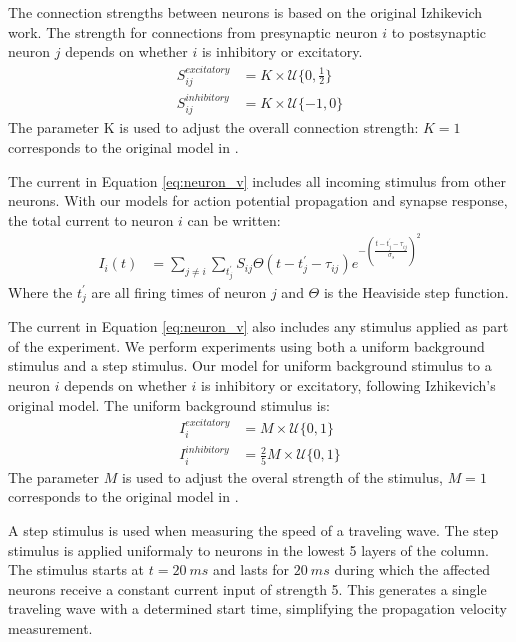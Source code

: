\documentclass[a4paper,11pt]{article}
\begin{document}
The connection strengths between neurons is based on the original Izhikevich work.
The strength for connections from presynaptic neuron $i$ to postsynaptic neuron $j$ depends on whether $i$ is inhibitory or excitatory.
\begin{align}
 S_{ij}^{excitatory} &= K \times \mathcal{U}\{0,\frac{1}{2} \} \\
 S_{ij}^{inhibitory} &= K \times \mathcal{U}\{-1,0 \} 
\end{align}
The parameter K is used to adjust the overall connection strength: $K=1$ corresponds to the original model in \cite{izzy_code}. 

The current in Equation \ref{eq:neuron_v} includes all incoming stimulus from other neurons.
With our models for action potential propagation and synapse response, the total current to neuron $i$ can be written:
\begin{align}
 I_i(t) &= \sum_{j\ne i} \sum_{t^\prime_j} S_{ij}  \Theta(t-t^\prime_j-\tau_{ij})e^{-(\frac{t-t^\prime_j-\tau_{ij}}{\sigma_s})^2}
\end{align}
Where the $t^\prime_j$ are all firing times of neuron $j$ and $\Theta$ is the Heaviside step function.

The current in Equation \ref{eq:neuron_v} also includes any stimulus applied as part of the experiment.
We perform experiments using both a uniform background stimulus and a step stimulus.
Our model for uniform background stimulus to a neuron $i$ depends on whether $i$ is inhibitory or excitatory, following Izhikevich's original model.
The uniform background stimulus is:
\begin{align}
 I_i^{excitatory} &= M \times \mathcal{U}\{0,1 \} \\
 I_i^{inhibitory} &= \frac{2}{5} M \times \mathcal{U}\{0,1 \}
\end{align}
The parameter $M$ is used to adjust the overal strength of the stimulus, $M=1$ corresponds to the original model in \cite{izzy_code}.

A step stimulus is used when measuring the speed of a traveling wave.
The step stimulus is applied uniformaly to neurons in the lowest 5 layers of the column.
The stimulus starts at $t=20~ms$ and lasts for $20~ms$ during which the affected neurons receive a constant current input of strength 5.
This generates a single traveling wave with a determined start time, simplifying the propagation velocity measurement.
\end{document}
